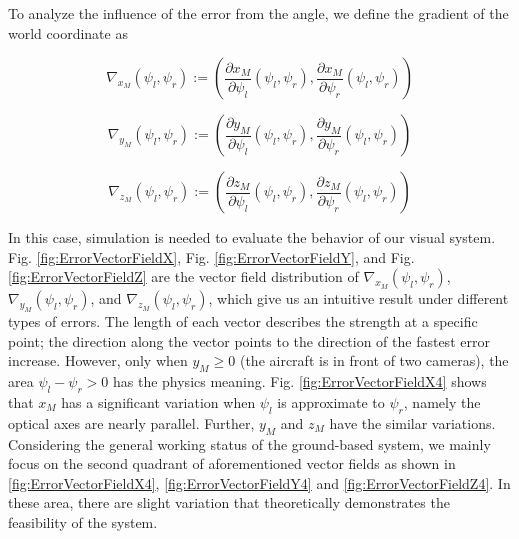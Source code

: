 To analyze the influence of the error from the angle, we define the gradient of the world coordinate as

\begin{equation}
	\nabla_{x_M}(\psi_l, \psi_r):=\left( \frac{\partial x_M}{\partial \psi_l}(\psi_l, \psi_r), \frac{\partial x_M}{\partial \psi_r}(\psi_l, \psi_r)  \right)
\end{equation}

\begin{equation}
	\nabla_{y_M}(\psi_l, \psi_r):=\left( \frac{\partial y_M}{\partial \psi_l}(\psi_l, \psi_r), \frac{\partial y_M}{\partial \psi_r}(\psi_l, \psi_r)  \right)
\end{equation}

\begin{equation}
	\nabla_{z_M}(\psi_l, \psi_r):=\left( \frac{\partial z_M}{\partial \psi_l}(\psi_l, \psi_r), \frac{\partial z_M}{\partial \psi_r}(\psi_l, \psi_r)  \right)
\end{equation}





In this case, simulation is needed to evaluate the behavior of our visual system. Fig. \ref{fig:ErrorVectorFieldX}, Fig. \ref{fig:ErrorVectorFieldY}, and Fig. \ref{fig:ErrorVectorFieldZ} are the vector field distribution of $\nabla_{x_M}(\psi_l, \psi_r)$, $\nabla_{y_M}(\psi_l, \psi_r)$, and $\nabla_{z_M}(\psi_l, \psi_r)$, which give us an intuitive result under different types of errors. The length of each vector describes the strength at a specific point; the direction along the vector points to the direction of the fastest error increase. However, only when $y_M \geq 0$ (the aircraft is in front of two cameras), the area $\psi_l - \psi_r > 0$ has the physics meaning. Fig. \ref{fig:ErrorVectorFieldX4} shows that $x_M$ has a significant variation when $\psi_l$ is approximate to $\psi_r$, namely the optical axes are nearly parallel. Further, $y_M$ and $z_M$ have the similar variations. Considering the general working status of the ground-based system, we mainly focus on the second  quadrant of aforementioned vector fields as shown in \ref{fig:ErrorVectorFieldX4}, \ref{fig:ErrorVectorFieldY4} and \ref{fig:ErrorVectorFieldZ4}. In these area, there are slight variation that theoretically demonstrates the feasibility of the system. 

 
